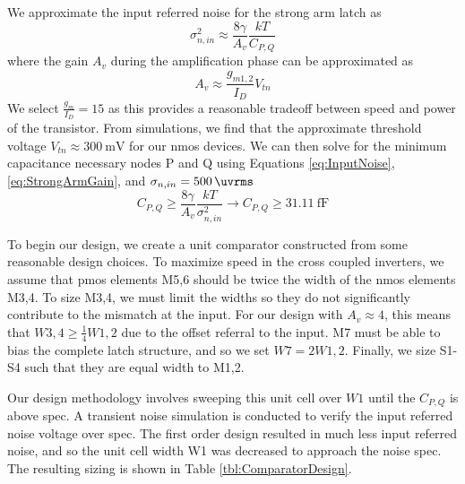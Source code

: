 \documentclass[10pt,journal]{IEEEtran}\usepackage{longtable}
\begin{document}
We approximate the input referred noise for the strong arm latch as
\begin{equation}
\sigma_{n,in}^2\approx\frac{8\gamma}{A_v}\frac{kT}{C_{P,Q}}
\label{eq:InputNoise}
\end{equation}
where the gain $A_v$ during the amplification phase can be approximated as
\begin{equation}
A_v\approx\frac{g_{m1,2}}{I_D}V_{tn}
\label{eq:StrongArmGain}
\end{equation}
We select $\frac{g_m}{I_D}=15$ as this provides a reasonable tradeoff between speed and power of the transistor. From simulations, we find that the approximate threshold voltage $V_{tn}\approx\SI{300}{\milli\volt}$ for our nmos devices. We can then solve for the minimum capacitance necessary nodes P and Q using Equations \ref{eq:InputNoise}, \ref{eq:StrongArmGain}, and $\sigma_{n,in}=\SI{500}{\uvrms}$ 
\begin{equation}
C_{P,Q}\geq\frac{8\gamma}{A_v}\frac{kT}{\sigma_{n,in}^2}\rightarrow C_{P,Q}\geq\SI{31.11}{\femto\farad}
\end{equation}

To begin our design, we create a unit comparator constructed from some reasonable design choices. To maximize speed in the cross coupled inverters, we assume that pmos elements M5,6 should be twice the width of the nmos elements M3,4. To size M3,4, we must limit the widths so they do not significantly contribute to the mismatch at the input. For our design with $A_v\approx4$, this means that $W3,4\geq\frac{1}{4}W1,2$ due to the offset referral to the input. M7 must be able to bias the complete latch structure, and so we set $W7=2W1,2$. Finally, we size S1-S4 such that they are equal width to M1,2.

Our design methodology involves sweeping this unit cell over $W1$ until the $C_{P,Q}$ is above spec. A transient noise simulation is conducted to verify the input referred noise voltage over spec. The first order design resulted in much less input referred noise, and so the unit cell width W1 was decreased to approach the noise spec. The resulting sizing is shown in Table \ref{tbl:ComparatorDesign}.
\end{document}
